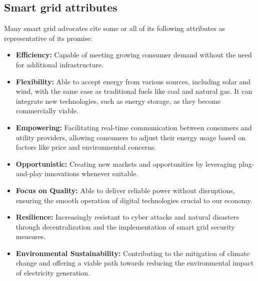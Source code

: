 \subsection{Smart grid attributes}
Many smart grid advocates cite some or all of its following attributes as representative of its promise:
\firmlist
\begin{itemize}


\item \textbf{  Efficiency:} Capable of meeting growing consumer demand without the need for additional infrastructure.

\item \textbf{  Flexibility: }Able to accept energy from various sources, including solar and wind, with the same ease as traditional fuels like coal and natural gas. It can integrate new technologies, such as energy storage, as they become commercially viable.

\item \textbf{  Empowering: }Facilitating real-time communication between consumers and utility providers, allowing consumers to adjust their energy usage based on factors like price and environmental concerns.

\item \textbf{  Opportunistic:} Creating new markets and opportunities by leveraging plug-and-play innovations whenever suitable.

\item\textbf{   Focus on Quality:} Able to deliver reliable power without disruptions, ensuring the smooth operation of digital technologies crucial to our economy.

\item \textbf{  Resilience:} Increasingly resistant to cyber attacks and natural disasters through decentralization and the implementation of smart grid security measures.

\item \textbf{  Environmental Sustainability:} Contributing to the mitigation of climate change and offering a viable path towards reducing the environmental impact of electricity generation. \cite{el2014smart}
\end{itemize}

